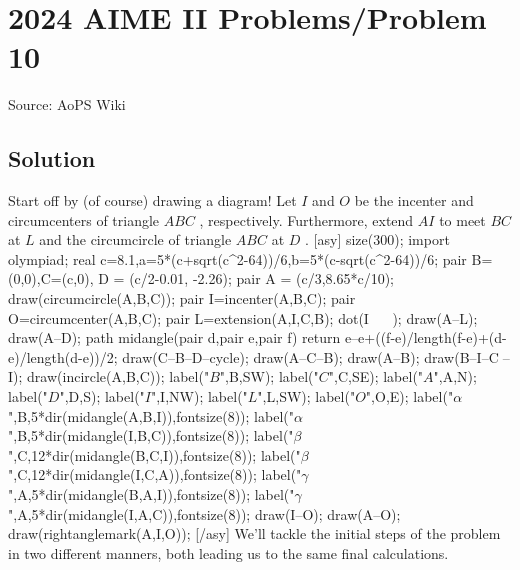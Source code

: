 \documentclass[12pt]{article}
\begin{document}
\section*{{2024 AIME II Problems/Problem 10}}
Source: AoPS Wiki

\subsection*{Solution}
Start off by (of course) drawing a diagram! Let $I$ and $O$ be the incenter and circumcenters of triangle $ABC$ , respectively. Furthermore, extend $AI$ to meet $BC$ at $L$ and the circumcircle of triangle $ABC$ at $D$ . [asy] size(300); import olympiad; real c=8.1,a=5*(c+sqrt(c^2-64))/6,b=5*(c-sqrt(c^2-64))/6; pair B=(0,0),C=(c,0), D = (c/2-0.01, -2.26); pair A = (c/3,8.65*c/10); draw(circumcircle(A,B,C)); pair I=incenter(A,B,C); pair O=circumcenter(A,B,C); pair L=extension(A,I,C,B); dot(I^^O^^A^^B^^C^^D^^L); draw(A--L); draw(A--D); path midangle(pair d,pair e,pair f) {return e--e+((f-e)/length(f-e)+(d-e)/length(d-e))/2;} draw(C--B--D--cycle); draw(A--C--B); draw(A--B); draw(B--I--C^^A--I); draw(incircle(A,B,C)); label("$B$",B,SW); label("$C$",C,SE); label("$A$",A,N); label("$D$",D,S); label("$I$",I,NW); label("$L$",L,SW); label("$O$",O,E); label("$\alpha$",B,5*dir(midangle(A,B,I)),fontsize(8)); label("$\alpha$",B,5*dir(midangle(I,B,C)),fontsize(8)); label("$\beta$",C,12*dir(midangle(B,C,I)),fontsize(8)); label("$\beta$",C,12*dir(midangle(I,C,A)),fontsize(8)); label("$\gamma$",A,5*dir(midangle(B,A,I)),fontsize(8)); label("$\gamma$",A,5*dir(midangle(I,A,C)),fontsize(8)); draw(I--O); draw(A--O); draw(rightanglemark(A,I,O)); [/asy] We'll tackle the initial steps of the problem in two different manners, both leading us to the same final calculations.
\end{document}
